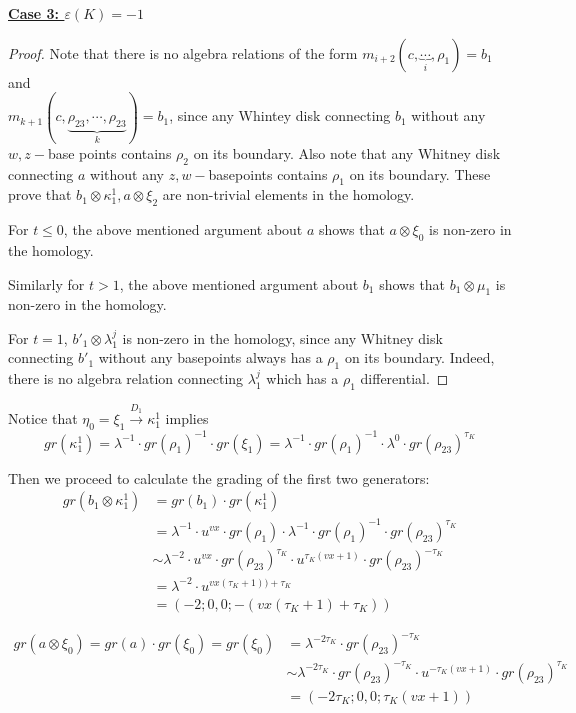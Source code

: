 \documentclass[11pt,reqno]{amsart}
\theoremstyle{definition}
\newtheorem *{remark}{Remark}
\begin{document}
\begin{subsection}{\underline{\textbf{Case 3: $\varepsilon(K)=-1$}}}
\begin{proof}
    Note that there is no algebra relations of the form $m_{i+2}(c,\underbrace{\cdots}_i,\rho_1)=b_1$ and \\ $m_{k+1}(c, \underbrace{\rho_{23}, \cdots, \rho_{23}}_k)=b_1$, since any Whintey disk connecting $b_1$ without any $w,z-$base points contains $\rho_2$ on its boundary. Also note that any Whitney disk connecting $a$ without any $z,w-$basepoints contains $\rho_1$ on its boundary. These prove that $b_1 \otimes \kappa_1^1, a\otimes \xi_2$ are non-trivial elements in the homology.

    For $t\leq 0$, the above mentioned argument about $a$ shows that $a \otimes \xi_0$ is non-zero in the homology.

    Similarly for $t>1$, the above mentioned argument about $b_1$ shows that $b_1\otimes \mu_1$ is non-zero in the homology. 

    For $t=1$, $b'_1 \otimes \lambda_1^j$ is non-zero in the homology, since any Whitney disk connecting $b'_1$ without any basepoints always has a $\rho_1$ on its boundary. Indeed, there is no algebra relation connecting $\lambda^j_1$ which has a $\rho_1$ differential. 

\end{proof}
    




Notice that $\eta_0 = \xi_1 \xrightarrow{D_1} \kappa^1_1$ implies 
\[gr(\kappa_1^1) = \lambda^{-1} \cdot gr(\rho_1)^{-1} \cdot gr(\xi_1) =  \lambda^{-1} \cdot gr(\rho_1)^{-1} \cdot \lambda^{0} \cdot gr(\rho_{23})^{\tau_K}\]

Then we proceed to calculate the grading of the first two generators:
\begin{align*}
gr(b_1 \otimes \kappa^1_1) &= gr(b_1) \cdot gr(\kappa^1_1) \\ &= 
  \lambda^{-1} \cdot u^{vx} \cdot gr(\rho_1) \cdot \lambda^{-1} \cdot gr(\rho_1)^{-1}\cdot gr(\rho_{23})^{\tau_K} \\
  &\sim \lambda^{-2} \cdot u^{vx} \cdot gr(\rho_{23})^{\tau_K} \cdot u^{\tau_K(vx+1)} \cdot gr(\rho_{23})^{-\tau_K} \\
  &= \lambda^{-2} \cdot u^{vx(\tau_K+1))+\tau_K} \\
  & = (-2;0,0; - (vx(\tau_K+1)+\tau_K))
\end{align*}



\begin{align*}
    gr(a \otimes \xi_0) = gr(a) \cdot gr(\xi_0) = gr(\xi_0) &= \lambda^{-2\tau_K} \cdot gr(\rho_{23})^{-\tau_K} \\
    &\sim \lambda^{-2\tau_K} \cdot gr(\rho_{23})^{-\tau_K} \cdot u^{-\tau_K(vx+1)} \cdot gr(\rho_{23})^{\tau_K} \\
    &= (-2\tau_K;0,0;\tau_K(vx+1))
\end{align*}


\end{subsection}
\end{document}
